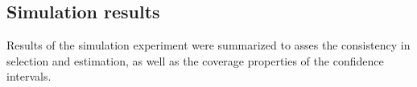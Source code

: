 \documentclass[authoryear, review, 11pt]{elsarticle}
\begin{document}
	\subsection{Simulation results}
	Results of the simulation experiment were summarized to asses the consistency in selection and estimation, as well as the coverage properties of the confidence intervals.
		

\end{document}
